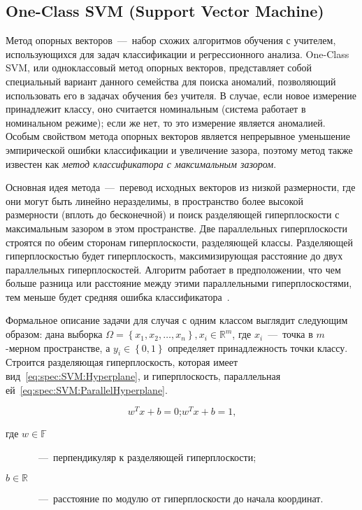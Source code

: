 \subsection{One-Class SVM (Support Vector Machine)}
Метод опорных векторов~---~набор схожих алгоритмов обучения с учителем, использующихся для задач классификации и регрессионного анализа. One-Class SVM, или одноклассовый метод опорных векторов, представляет собой специальный вариант данного семейства для поиска аномалий, позволяющий использовать его в задачах обучения без учителя. В случае, если новое измерение принадлежит классу, оно считается номинальным (система работает в номинальном режиме); если же нет, то это измерение является аномалией. Особым свойством метода опорных векторов является непрерывное уменьшение эмпирической ошибки классификации и увеличение зазора, поэтому метод также известен как \textit{метод классификатора с максимальным зазором}.

Основная идея метода~---~перевод исходных векторов из низкой размерности, где они могут быть линейно неразделимы, в пространство более высокой размерности (вплоть до бесконечной) и поиск разделяющей гиперплоскости с максимальным зазором в этом пространстве. Две параллельных гиперплоскости строятся по обеим сторонам гиперплоскости, разделяющей классы. Разделяющей гиперплоскостью будет гиперплоскость, максимизирующая расстояние до двух параллельных гиперплоскостей. Алгоритм работает в предположении, что чем больше разница или расстояние между этими параллельными гиперплоскостями, тем меньше будет средняя ошибка классификатора~\cite{LifshitsInternetAlgorithms}.

Формальное описание задачи для случая с одним классом выглядит следующим образом: дана выборка $\Omega = \left\{x_1,x_2,\dots,x_n\right\}, x_i\in {\mathbb{R}}^m$, где $x_i$~---~точка в $m$-мерном пространстве, а $y_i\in \left\{0,1\right\}$ определяет принадлежность точки классу. Строится разделяющая гиперплоскость, которая имеет вид~\eqref{eq:spec:SVM:Hyperplane}, и гиперплоскость, параллельная ей~\eqref{eq:spec:SVM:ParallelHyperplane}.

\begin{subequations}
\begin{equation} \label{eq:spec:SVM:Hyperplane}
w^T x + b = 0 \text{;}
\end{equation}
\begin{equation}\label{eq:spec:SVM:ParallelHyperplane}
w^T x + b = 1 \text{,}
\end{equation}
\end{subequations}
\begin{description}
	\item[где $w\in \mathbb{F}$]~---~перпендикуляр к разделяющей гиперплоскости;
	\item[$b\in \mathbb{R}$]~---~расстояние по модулю от гиперплоскости до начала координат.
\end{description}

